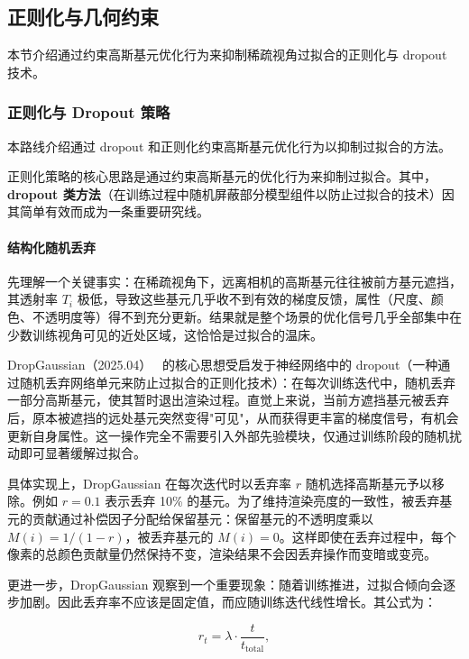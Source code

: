 \subsection{正则化与几何约束}
\label{ss:12_1}

本节介绍通过约束高斯基元优化行为来抑制稀疏视角过拟合的正则化与 dropout 技术。

\subsubsection{正则化与 Dropout 策略}

本路线介绍通过 dropout 和正则化约束高斯基元优化行为以抑制过拟合的方法。

正则化策略的核心思路是通过约束高斯基元的优化行为来抑制过拟合。其中，\textbf{dropout 类方法}（在训练过程中随机屏蔽部分模型组件以防止过拟合的技术）因其简单有效而成为一条重要研究线。

\paragraph{结构化随机丢弃}

先理解一个关键事实：在稀疏视角下，远离相机的高斯基元往往被前方基元遮挡，其透射率 $T_i$ 极低，导致这些基元几乎收不到有效的梯度反馈，属性（尺度、颜色、不透明度等）得不到充分更新。结果就是整个场景的优化信号几乎全部集中在少数训练视角可见的近处区域，这恰恰是过拟合的温床。

DropGaussian（2025.04）~\cite{2504_00773} 的核心思想受启发于神经网络中的 dropout（一种通过随机丢弃网络单元来防止过拟合的正则化技术）：在每次训练迭代中，随机丢弃一部分高斯基元，使其暂时退出渲染过程。直觉上来说，当前方遮挡基元被丢弃后，原本被遮挡的远处基元突然变得"可见"，从而获得更丰富的梯度信号，有机会更新自身属性。这一操作完全不需要引入外部先验模块，仅通过训练阶段的随机扰动即可显著缓解过拟合。

具体实现上，DropGaussian 在每次迭代时以丢弃率 $r$ 随机选择高斯基元予以移除。例如 $r = 0.1$ 表示丢弃 10\% 的基元。为了维持渲染亮度的一致性，被丢弃基元的贡献通过补偿因子分配给保留基元：保留基元的不透明度乘以 $M(i) = 1/(1-r)$，被丢弃基元的 $M(i) = 0$。这样即使在丢弃过程中，每个像素的总颜色贡献量仍然保持不变，渲染结果不会因丢弃操作而变暗或变亮。

更进一步，DropGaussian 观察到一个重要现象：随着训练推进，过拟合倾向会逐步加剧。因此丢弃率不应该是固定值，而应随训练迭代线性增长。其公式为：

\begin{equation}
    r_t = \lambda \cdot \frac{t}{t_{\text{total}}},
\end{equation}

